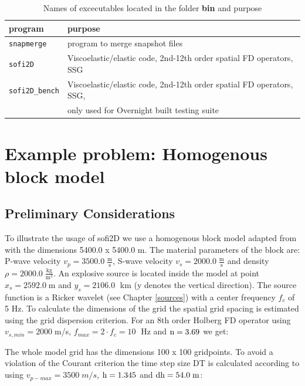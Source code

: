\documentclass[11pt,onecolumn,oneside]{article}
\begin{document}
\begin{table}[hbt]
\begin{tabular}{ll}
program & purpose \\ \hline
\texttt{snapmerge} & program to merge snapshot files \\
\texttt{sofi2D} & Viscoelastic/elastic code,  2nd-12th order spatial FD operators, SSG \\
\texttt{sofi2D\_bench} & Viscoelastic/elastic code,  2nd-12th order spatial FD operators, SSG, \\
& only used for Overnight built testing suite \\
\end{tabular}
\caption{Names of excecutables located in the folder \textbf{bin} and purpose}
\label{tab_programs}
\end{table}

\section{Example problem: Homogenous block model}
\label{simple test}
\subsection{Preliminary Considerations}
To illustrate the usage of sofi2D we use a homogenous block model adapted from \cite{kang:04} with the dimensions 5400.0 x 5400.0 m. The material parameters of the block are:  P-wave velocity $v_p=3500.0\; \frac{\mathrm{m}}{\mathrm{s}}$, S-wave velocity $v_s=2000.0\; \frac{\mathrm{m}}{\mathrm{s}}$ and density $\rho=2000.0\; \frac{\mathrm{kg}}{\mathrm{m}^3}$. An explosive source is located inside the model at point  $x_s=2592.0\;$m and $y_s=2106.0\;$ km (y denotes the vertical direction). The source function is a Ricker wavelet (see Chapter \ref{sources}) with a center frequency $f_c$ of 5 Hz. To calculate the dimensions of the grid the spatial grid spacing is estimated using the grid dispersion criterion. For an 8th order Holberg FD operator using $v_{s,min}=2000\;$m/s, $f_{max}=2 \cdot f_c=10\;$ Hz and $\rm n=3.69$ we get:


The whole model grid has the dimensions 100 x 100 gridpoints. To avoid a violation of the Courant criterion the time step size DT is calculated according to using $v_{p-max}=3500\; m/s$, $\rm h=1.345$ and $\rm{dh=54.0\; m}$:

\end{document}
